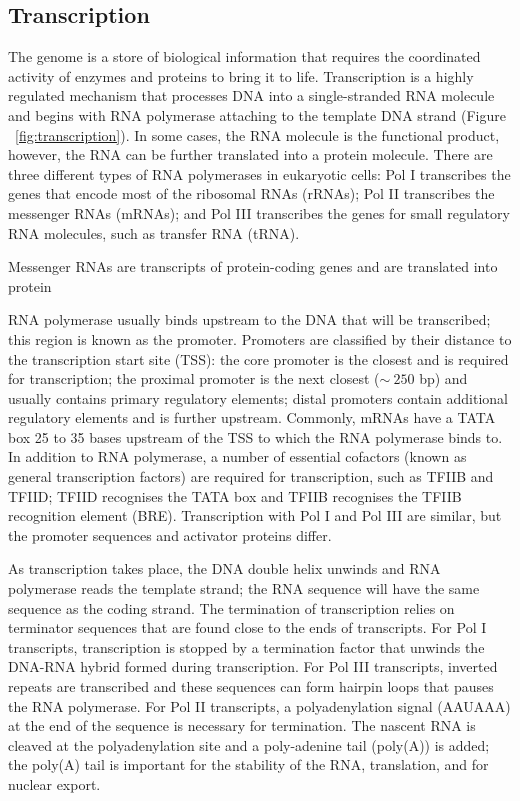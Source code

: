 \subsection{Transcription}

The genome is a store of biological information that requires the coordinated activity of enzymes and proteins to bring it to life. Transcription is a highly regulated mechanism that processes DNA into a single-stranded RNA molecule and begins with RNA polymerase attaching to the template DNA strand (Figure ~\ref{fig:transcription}). In some cases, the RNA molecule is the functional product, however, the RNA can be further translated into a protein molecule. There are three different types of RNA polymerases in eukaryotic cells: Pol I transcribes the genes that encode most of the ribosomal RNAs (rRNAs); Pol II transcribes the messenger RNAs (mRNAs); and Pol III transcribes the genes for small regulatory RNA molecules, such as transfer RNA (tRNA).

Messenger RNAs are transcripts of protein-coding genes and are translated into protein

RNA polymerase usually binds upstream to the DNA that will be transcribed; this region is known as the promoter. Promoters are classified by their distance to the transcription start site (TSS): the core promoter is the closest and is required for transcription; the proximal promoter is the next closest ($\sim~250$ bp) and usually contains primary regulatory elements; distal promoters contain additional regulatory elements and is further upstream. Commonly, mRNAs have a TATA box 25 to 35 bases upstream of the TSS to which the RNA polymerase binds to. In addition to RNA polymerase, a number of essential cofactors (known as general transcription factors) are required for transcription, such as TFIIB and TFIID; TFIID recognises the TATA box and TFIIB recognises the TFIIB recognition element (BRE). Transcription with Pol I and Pol III are similar, but the promoter sequences and activator proteins differ.

As transcription takes place, the DNA double helix unwinds and RNA polymerase reads the template strand; the RNA sequence will have the same sequence as the coding strand. The termination of transcription relies on terminator sequences that are found close to the ends of transcripts. For Pol I transcripts, transcription is stopped by a termination factor that unwinds the DNA-RNA hybrid formed during transcription. For Pol III transcripts, inverted repeats are transcribed and these sequences can form hairpin loops that pauses the RNA polymerase. For Pol II transcripts, a polyadenylation signal (AAUAAA) at the end of the sequence is necessary for termination\cite{pmid3479794}. The nascent RNA is cleaved at the polyadenylation site and a poly-adenine tail (poly(A)) is added; the poly(A) tail is important for the stability of the RNA, translation, and for nuclear export.

